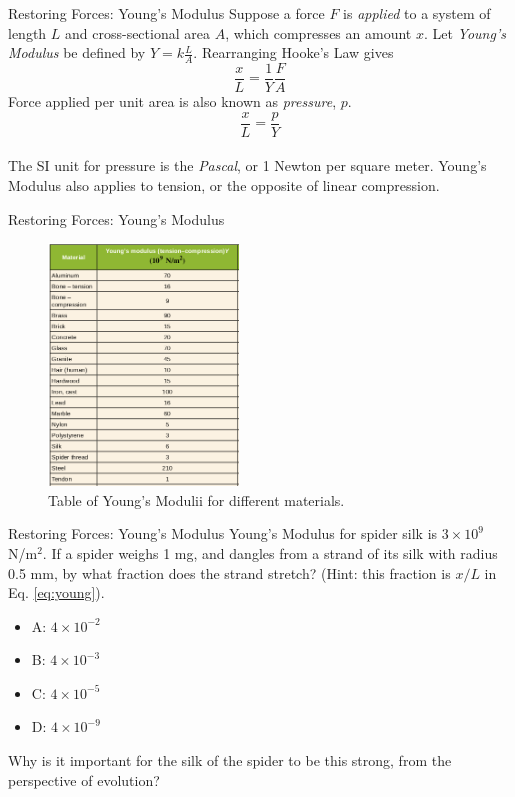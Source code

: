 \documentclass{beamer}
\begin{document}
\begin{frame}{Restoring Forces: Young's Modulus}
Suppose a force $F$ is \textit{applied} to a system of length $L$ and cross-sectional area $A$, which compresses an amount $x$.  Let \textit{Young's Modulus} be defined by $Y = k \frac{L}{A}$.  Rearranging Hooke's Law  gives \\
\begin{equation}
\frac{x}{L} = \frac{1}{Y}\frac{F}{A}
\end{equation}
\vspace{0.5cm}
Force applied per unit area is also known as \textit{pressure}, $p$.
\begin{equation}
\boxed{\frac{x}{L} = \frac{p}{Y}}
\label{eq:young}
\end{equation} \\
The SI unit for pressure is the \textit{Pascal}, or 1 Newton per square meter.  Young's Modulus also applies to tension, or the opposite of linear compression.
\end{frame}

\begin{frame}{Restoring Forces: Young's Modulus}
\begin{figure}
\centering
\includegraphics[width=0.45\textwidth]{figures/young.png}
\caption{\label{fig:young} Table of Young's Modulii for different materials.}
\end{figure}
\end{frame}

\begin{frame}{Restoring Forces: Young's Modulus}
Young's Modulus for spider silk is $3 \times 10^9$ N/m$^2$.  If a spider weighs 1 mg, and dangles from a strand of its silk with radius 0.5 mm, by what fraction does the strand stretch?  (Hint: this fraction is $x/L$ in Eq. \ref{eq:young}).
\begin{itemize}
\item A: $4 \times 10^{-2}$
\item B: $4 \times 10^{-3}$
\item C: $4 \times 10^{-5}$
\item D: $4 \times 10^{-9}$
\end{itemize}
Why is it important for the silk of the spider to be this strong, from the perspective of evolution?
\end{frame}
\end{document}
